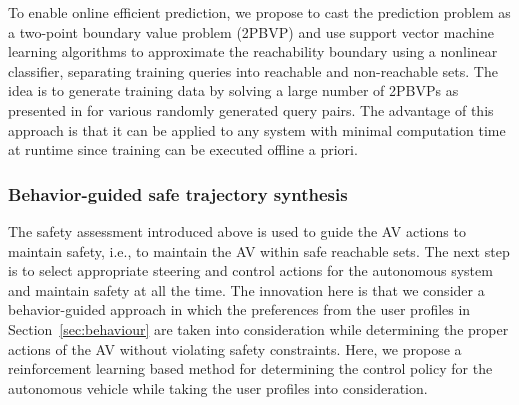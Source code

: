 To enable online efficient prediction, we propose to cast the prediction problem as a two-point boundary value problem (2PBVP) \cite{allen2014machine} and use support vector machine learning algorithms to approximate the reachability boundary using a nonlinear classifier, separating training queries into reachable and non-reachable sets. The idea is to generate training data by solving a large number of 2PBVPs as presented in \cite{allen2014machine} for various randomly generated query pairs. 
The advantage of this approach is that it can be applied to any system with minimal computation time at runtime since training can be executed offline a priori. 

\subsubsection{Behavior-guided safe trajectory synthesis} 
The safety assessment introduced above is used to guide the AV actions to maintain safety, i.e., to maintain the AV within safe reachable sets. 
The next step is to select appropriate steering and control actions for the autonomous system and maintain safety at all the time. 
The innovation here is that we consider a behavior-guided approach in which the preferences from the user profiles in Section~\ref{sec:behaviour} are taken into consideration while determining the proper actions of the AV without violating safety constraints. 
Here, we propose a reinforcement learning based method for determining the control policy for the autonomous vehicle while taking the user profiles into consideration. 

